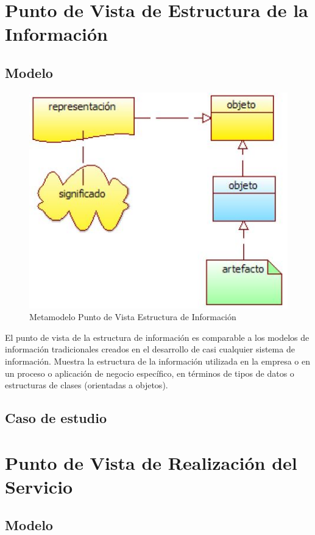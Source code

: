 \section{Punto de Vista de Estructura de la Información}

\subsection{Modelo}

\begin{figure}[th!]
	\centering
	\includegraphics[width=0.5\linewidth]{arquitectura/imagenes/modeloEstructuraDeInformacion}
	\caption{Metamodelo Punto de Vista Estructura de Información}
	\label{metamodeloEstructuraInformacion}
\end{figure}
El punto de vista de la estructura de información es comparable a los modelos de información tradicionales creados en el desarrollo de casi cualquier sistema de información. Muestra la estructura de la información utilizada en la empresa o en un proceso o aplicación de negocio específico, en términos de tipos de datos o estructuras de clases (orientadas a objetos). 

\subsection{Caso de estudio}

\newpage

\section{Punto de Vista de Realización del Servicio}

\subsection{Modelo}

